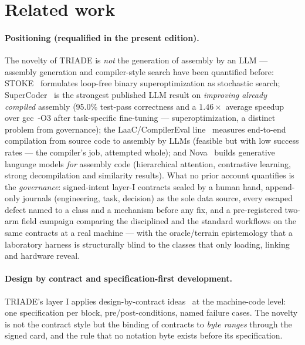 \documentclass[11pt,a4paper]{article}
\begin{document}
\section{Related work}\label{sec:related}

\paragraph{Positioning (requalified in the present edition).}
The novelty of TRIADE is \emph{not} the generation of assembly by an
LLM --- assembly generation and compiler-style search have been
quantified before: STOKE~\cite{stoke} formulates loop-free binary
superoptimization as stochastic search; SuperCoder~\cite{supercoder}
is the strongest published LLM result on \emph{improving already
compiled} assembly (95.0\% test-pass correctness and a $1.46\times$
average speedup over gcc~-O3 after task-specific fine-tuning ---
superoptimization, a distinct problem from governance);
the LaaC/CompilerEval line~\cite{laac} measures end-to-end compilation
from source code to assembly by LLMs (feasible but with low success
rates --- the compiler's job, attempted whole);
and Nova~\cite{nova} builds generative language models \emph{for}
assembly code (hierarchical attention, contrastive learning, strong
decompilation and similarity results). What no
prior account quantifies is the \emph{governance}: signed-intent
layer-I contracts sealed by a human hand, append-only journals
(engineering, task, decision) as the sole data source, every escaped
defect named to a class and a mechanism before any fix, and a
pre-registered two-arm field campaign comparing the disciplined and
the standard workflows on the same contracts at a real machine ---
with the oracle/terrain epistemology that a laboratory harness is
structurally blind to the classes that only loading, linking and
hardware reveal.

\paragraph{Design by contract and specification-first development.}
TRIADE's layer I applies design-by-contract ideas~\cite{meyer1992} at the
machine-code level: one specification per block, pre/post-conditions,
named failure cases. The novelty is not the contract style but the
binding of contracts to \emph{byte ranges} through the signed card, and
the rule that no notation byte exists before its specification.
\end{document}
